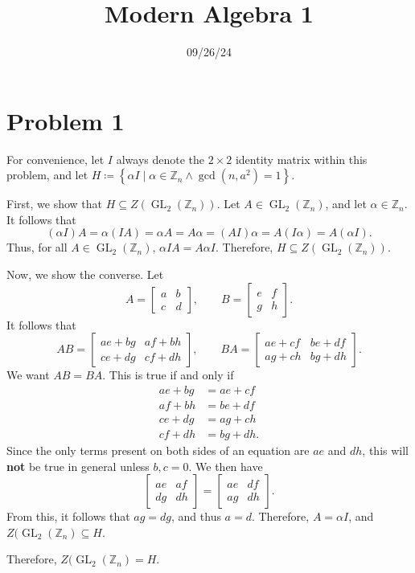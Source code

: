 \documentclass[11pt, letterpaper]{report}
\title{Modern Algebra 1}
\date{09/26/24}
\renewenvironment{solution}[1][]{\begin{setsolution}}{\end{setsolution}}
\begin{document}
\makeproblem
\section*{Problem 1}
\begin{solution}
	For convenience, let $I$ always denote the $2\times 2$ identity matrix within this problem, and let $H\coloneqq \left\{ \alpha I  \mid \alpha \in\mathbb{Z}_n \land \operatorname{gcd}(n,a^2) =1\right\} $.

	First, we show that $H\subseteq Z(\operatorname{GL}_2(\mathbb{Z}_n)) $. Let $A \in \operatorname{GL}_2(\mathbb{Z}_n) $, and let $\alpha \in\mathbb{Z}_n$. It follows that
	\[
		(\alpha I)A=\alpha (IA)=\alpha A=A\alpha =(AI)\alpha =A(I\alpha )=A(\alpha I)
	.\]
	Thus, for all $A\in \operatorname{GL}_2(\mathbb{Z}_n) $, $\alpha IA=A\alpha I$. Therefore, $H\subseteq Z(\operatorname{GL}_2(\mathbb{Z}_n)) $.

Now, we show the converse. Let
\[
	A=\begin{bmatrix} a&b \\ c&d \end{bmatrix} ,\qquad B=\begin{bmatrix} e&f \\ g&h \end{bmatrix} 
.\]
It follows that
\[
	AB=\begin{bmatrix} ae+bg&af+bh \\ ce+dg&cf+dh \end{bmatrix} ,\qquad BA=\begin{bmatrix} ae+cf&be+df \\ ag+ch&bg+dh \end{bmatrix} 
.\]
We want $AB=BA$. This is true if and only if
\begin{align*}
	ae+bg&=ae+cf\\
	af+bh&=be+df\\
	ce+dg&=ag+ch\\
	cf+dh&=bg+dh
.\end{align*}
Since the only terms present on both sides of an equation are $ae$ and $dh$, this will \textbf{not} be true in general unless $b,c=0$. We then have
\[
	\begin{bmatrix} ae&af \\ dg&dh \end{bmatrix}=\begin{bmatrix} ae&df \\ ag&dh \end{bmatrix} 
.\]
From this, it follows that $ag=dg$, and thus $a=d$. Therefore, $A=\alpha I$, and $Z(\operatorname{GL}_2(\mathbb{Z}_n) \subseteq H$.

Therefore, $Z(\operatorname{GL}_2(\mathbb{Z}_n) =H$.

\end{solution}
\end{document}
